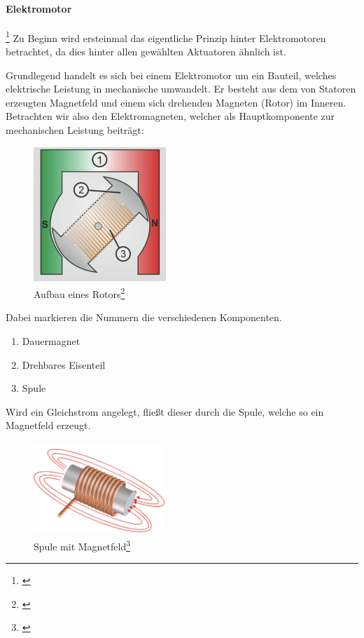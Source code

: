 \paragraph{Elektromotor} \footnote{\cite*[siehe ][]{Aufbau.Elektromotoren}}
Zu Beginn wird ersteinmal das eigentliche Prinzip hinter Elektromotoren betrachtet, da dies hinter allen gewählten Aktuatoren
ähnlich ist.

Grundlegend handelt es sich bei einem Elektromotor um ein Bauteil, welches elektrische Leistung in mechanische umwandelt.
Er besteht aus dem von Statoren erzeugten Magnetfeld und einem sich drehenden Magneten (Rotor) im Inneren.
Betrachten wir also den Elektromagneten, welcher als Hauptkomponente zur mechanischen Leistung beiträgt:

\begin{figure}[htbp]
	\centering
	\includegraphics[width=5cm]{img/AufbauElektromagnet}
	\caption{Aufbau eines Rotors\footnote{\cite*[siehe ][]{Aufbau.Elektromotoren}}}
	\label{fig:Elektromagnet}
\end{figure}
Dabei markieren die Nummern die verschiedenen Komponenten.
\begin{enumerate}
	\item Dauermagnet %
	\item Drehbares Eisenteil
	\item Spule
\end{enumerate}
Wird ein Gleichstrom angelegt, fließt dieser durch die Spule, welche so ein Magnetfeld erzeugt.
\begin{figure}[htbp]
	\centering
	\includegraphics[width=5cm]{img/Magnetfeld}
	\caption{Spule mit Magnetfeld\footnote{\cite*[siehe ][]{Elektromagnete}}}
	\label{fig:Magnetfeld}
\end{figure}
